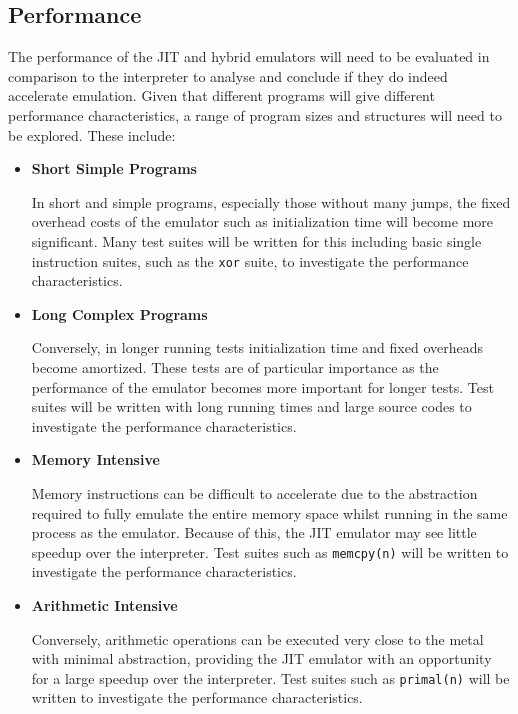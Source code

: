 \subsection{Performance}
\label{section:req-cap-performance}

The performance of the JIT and hybrid emulators will need to be evaluated in comparison to the interpreter to analyse and conclude if they do indeed accelerate emulation. Given that different programs will give different performance characteristics, a range of program sizes and structures will need to be explored. These include:

\begin{itemize}
    \item \textbf{Short Simple Programs}
    
    In short and simple programs, especially those without many jumps, the fixed overhead costs of the emulator such as initialization time will become more significant. Many test suites will be written for this including basic single instruction suites, such as the \texttt{xor} suite, to investigate the performance characteristics.
    
    \item \textbf{Long Complex Programs}
    
    Conversely, in longer running tests initialization time and fixed overheads become amortized. These tests are of particular importance as the performance of the emulator becomes more important for longer tests. Test suites will be written with long running times and large source codes to investigate the performance characteristics.

    \item \textbf{Memory Intensive}
    
    Memory instructions can be difficult to accelerate due to the abstraction required to fully emulate the entire memory space whilst running in the same process as the emulator. Because of this, the JIT emulator may see little speedup over the interpreter. Test suites such as \texttt{memcpy(n)} will be written to investigate the performance characteristics.

    \item \textbf{Arithmetic Intensive}
    
    Conversely, arithmetic operations can be executed very close to the metal with minimal abstraction, providing the JIT emulator with an opportunity for a large speedup over the interpreter. Test suites such as \texttt{primal(n)} will be written to investigate the performance characteristics.


\end{itemize}

